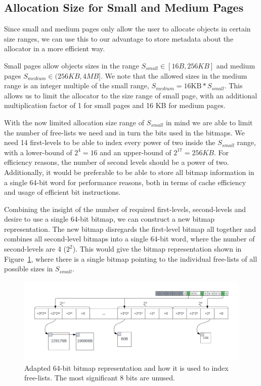 
\subsection{Allocation Size for Small and Medium Pages}

Since small and medium pages only allow the user to allocate objects in certain size ranges, we can use this to our advantage to store metadata about the allocator in a more efficient way.

Small pages allow objects sizes in the range $S_{small} \in [16B, 256KB]$ and medium pages $S_{medium} \in (256KB, 4MB]$. We note that the allowed sizes in the medium range is an integer multiple of the small range, $S_{medium} = \text{16KB} * S_{small}$. This allows us to limit the allocator to the size range of small page, with an additional multiplication factor of 1 for small pages and 16 KB for medium pages.

With the now limited allocation size range of $S_{small}$ in mind we are able to limit the number of free-lists we need and in turn the bits used in the bitmaps. We need 14 first-levels to be able to index every power of two inside the $S_{small}$ range, with a lower-bound of $2^4 = 16$ and an upper-bound of $2^17 = 256KB$. For efficiency reasons, the number of second levels should be a power of two. Additionally, it would be preferable to be able to store all bitmap information in a single 64-bit word for performance reasons, both in terms of cache efficiency and usage of efficient bit instructions.


Combining the insight of the number of required first-levels, second-levels and desire to use a single 64-bit bitmap, we can construct a new bitmap representation. The new bitmap disregards the first-level bitmap all together and combines all second-level bitmaps into a single 64-bit word, where the number of second-levels are 4 ($2^2$). This would give the bitmap representation shown in Figure~\ref{fig:adapted_bitmap}, where there is a single bitmap pointing to the individual free-lists of all possible sizes in $S_{small}$.

\begin{figure}[H]
    \centering
    \includegraphics[width=1\textwidth]{figures/adapted_bitmap.png}
    \caption{Adapted 64-bit bitmap representation and how it is used to index free-lists. The most significant 8 bits are unused.}
    \label{fig:adapted_bitmap}
\end{figure}

